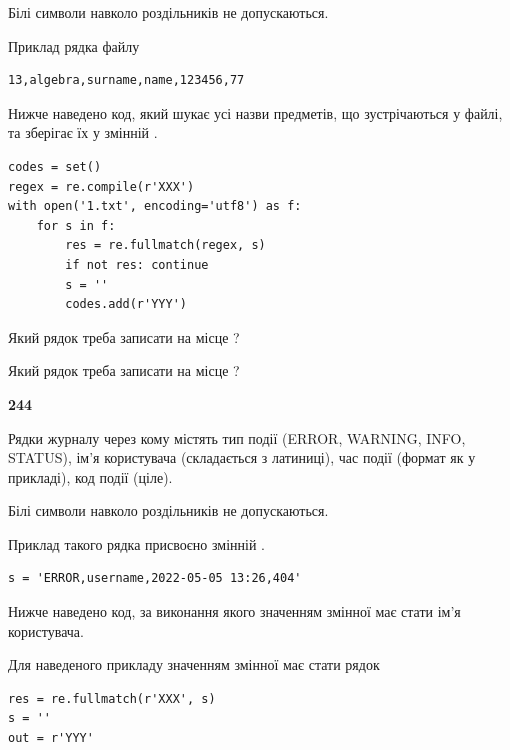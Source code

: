 Білі символи навколо роздільників не допускаються.

Приклад рядка файлу



\begin{verbatim}
13,algebra,surname,name,123456,77
\end{verbatim}


Нижче наведено код, який шукає усі назви предметів, що зустрічаються у файлі, та зберігає їх у змінній .



\begin{verbatim}
codes = set()
regex = re.compile(r'XXX')
with open('1.txt', encoding='utf8') as f:
    for s in f:
        res = re.fullmatch(regex, s)
        if not res: continue
        s = ''
        codes.add(r'YYY')
\end{verbatim}





Який рядок треба записати на місце  ?\par
\vspace{5mm}


Який рядок треба записати на місце  ?\par


\newpage

{\begin {center}\textbf{ 244}\end {center}}\par
Рядки журналу через кому містять тип події (ERROR, WARNING, INFO, STATUS), ім'я користувача (складається з латиниці), час події (фор\-мат як у прикладі), код події (ціле).

Білі символи навколо роздільників не допускаються.

Приклад такого рядка присвоєно змінній .



\begin{verbatim}
s = 'ERROR,username,2022-05-05 13:26,404'
\end{verbatim}


Нижче наведено код, за виконання якого значенням змінної  має стати ім'я користувача.

Для наведеного прикладу значенням змінної  має стати рядок 



\begin{verbatim}
res = re.fullmatch(r'XXX', s)
s = ''
out = r'YYY'
\end{verbatim}


